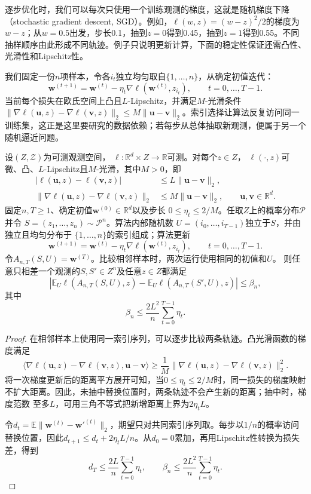逐步优化时，我们可以每次只使用一个训练观测的梯度，这就是随机梯度下降（stochastic gradient descent, SGD）。例如，$\ell(w,z)=(w-z)^2/2$的梯度为$w-z$；从$w=0.5$出发，步长0.1，抽到$z=0$得到0.45，抽到$z=1$得到0.55。不同抽样顺序由此形成不同轨迹。例子只说明更新计算，下面的稳定性保证还需凸性、光滑性和Lipschitz性。

我们固定一份$n$项样本，令各$i_t$独立均匀取自$\{1,\ldots,n\}$，从确定初值迭代：
\begin{equation}
 \bm w^{(t+1)}=\bm w^{(t)}-\eta_t\nabla\ell(\bm w^{(t)},z_{i_t}),
 \qquad t=0,\ldots,T-1.
 \label{eq:sgd-update}
\end{equation}
当前每个损失在欧氏空间上凸且$L$-Lipschitz，并满足$M$-光滑条件$\|\nabla\ell(\bm u,z)-\nabla\ell(\bm v,z)\|_2\leq M\|\bm u-\bm v\|_2$。索引选择让算法反复访问同一训练集，这正是这里要研究的数据依赖；若每步从总体抽取新观测，便属于另一个随机逼近问题。

\begin{theorem}[凸光滑SGD的稳定性]
\label{thm:convex-sgd-stability}
设$(Z,\mathcal Z)$为可测观测空间，
$\ell:\mathbb R^d\times Z\to\mathbb R$可测。对每个$z\in Z$，
$\ell(\cdot,z)$可微、凸、$L$-Lipschitz且$M$-光滑，其中$M>0$，即
\[
\begin{aligned}
 |\ell(\bm u,z)-\ell(\bm v,z)|
 &\leq L\|\bm u-\bm v\|_2,\\
 \|\nabla\ell(\bm u,z)-\nabla\ell(\bm v,z)\|_2
 &\leq M\|\bm u-\bm v\|_2,
 \qquad \bm u,\bm v\in\mathbb R^d.
\end{aligned}
\]
固定$n,T\geq1$、确定初值$\bm w^{(0)}\in\mathbb R^d$以及步长
$0\leq\eta_t\leq2/M$。任取$Z$上的概率分布$\mathcal P$并令
$S=(z_1,\ldots,z_n)\sim\mathcal P^n$。算法内部随机数
$U=(i_0,\ldots,i_{T-1})$独立于$S$，并由独立且均匀分布于
$\{1,\ldots,n\}$的索引组成；算法更新
\[
 \bm w^{(t+1)}
 =\bm w^{(t)}-\eta_t\nabla\ell(\bm w^{(t)},z_{i_t}),
 \qquad t=0,\ldots,T-1.
\]
令$A_{n,T}(S,U)=\bm w^{(T)}$。比较相邻样本时，两次运行使用相同的初值和$U$。
则任意只相差一个观测的$S,S'\in Z^n$及任意$z\in Z$都满足
\[
 \left|\mathbb E_U\ell(A_{n,T}(S,U),z)
 -\mathbb E_U\ell(A_{n,T}(S',U),z)\right|\leq\beta_n,
\]
其中
\[
 \beta_n\leq\frac{2L^2}{n}\sum_{t=0}^{T-1}\eta_t.
\]
\end{theorem}
\begin{proof}
在相邻样本上使用同一索引序列，可以逐步比较两条轨迹。凸光滑函数的梯度满足
\[
 \langle\nabla\ell(\bm u,z)-\nabla\ell(\bm v,z),\bm u-\bm v\rangle
 \geq\frac1M\|\nabla\ell(\bm u,z)-\nabla\ell(\bm v,z)\|_2^2.
\]
将一次梯度更新后的距离平方展开可知，当$0\leq\eta_t\leq2/M$时，同一损失的梯度映射
不扩大距离。因此，未抽中替换位置时，两条轨迹不会产生新的距离；抽中时，梯度范数
至多$L$，可用三角不等式把新增距离上界为$2\eta_tL$。

令$d_t=\mathbb E\|\bm w^{(t)}-\bm w'^{(t)}\|_2$，期望只对共同索引序列取。每步以$1/n$的概率访问替换位置，因此$d_{t+1}\leq d_t+2\eta_tL/n$。从$d_0=0$累加，再用Lipschitz性转换为损失差，得到
\begin{equation}
 d_T\leq\frac{2L}{n}\sum_{t=0}^{T-1}\eta_t,
 \qquad
 \beta_n\leq\frac{2L^2}{n}\sum_{t=0}^{T-1}\eta_t.
 \label{eq:convex-sgd-stability}
\end{equation}
\end{proof}

